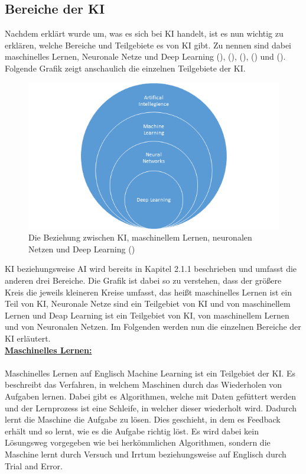 \documentclass[12pt,toc=bib,toc=listof]{scrreprt}
\begin{document}
\subsection{Bereiche der KI} %
\label{sec:bereicheDerKI}
Nachdem erklärt wurde um, was es sich bei KI handelt, ist es nun wichtig zu erklären, welche Bereiche und Teilgebiete es von KI gibt. Zu nennen sind dabei maschinelles Lernen, Neuronale Netze und Deep Learning (\cite{Bhatt2021}), (\cite{Hecker2018}), (\cite{Mocko2021}), (\cite{Roscher2025}) und (\cite{Zhu2021}).
Folgende Grafik zeigt anschaulich die einzelnen Teilgebiete der KI.
\begin{figure} [H]
    \centering
    \includegraphics[width=0.75\linewidth]{./Bilder/Mocko_Die Beziehung zwischen KI, maschinellem Lernen, neuronalen Netzen und Deep Learning.png}
    \caption{Die Beziehung zwischen KI, maschinellem Lernen, neuronalen Netzen und Deep Learning (\cite{Mocko2021})}
    \label{fig:enter-label}
\end{figure}
\noindent KI beziehungsweise AI wird bereits in Kapitel 2.1.1 beschrieben und umfasst die anderen drei Bereiche. Die Grafik ist dabei so zu verstehen, dass der größere Kreis die jeweils kleineren Kreise umfasst, das heißt maschinelles Lernen ist ein Teil von KI, Neuronale Netze sind ein Teilgebiet von KI und von maschinellem Lernen und Deap Learning ist ein Teilgebiet von KI, von maschinellem Lernen und von Neuronalen Netzen. Im Folgenden werden nun die einzelnen Bereiche der KI erläutert.\\
\newpage
\noindent\textbf{\underline{Maschinelles Lernen:}}\\
\\
Maschinelles Lernen auf Englisch Machine Learning ist ein Teilgebiet der KI. Es beschreibt das Verfahren, in welchem Maschinen durch das Wiederholen von Aufgaben lernen. Dabei gibt es Algorithmen, welche mit Daten gefüttert werden und der Lernprozess ist eine Schleife, in welcher dieser wiederholt wird. Dadurch lernt die Maschine die Aufgabe zu lösen. Dies geschieht, in dem es Feedback erhält und so lernt, wie es die Aufgabe richtig löst. Es wird dabei kein Lösungsweg vorgegeben wie bei herkömmlichen Algorithmen, sondern die Maschine lernt durch Versuch und Irrtum beziehungsweise auf Englisch durch Trial and Error.\\
\end{document}
